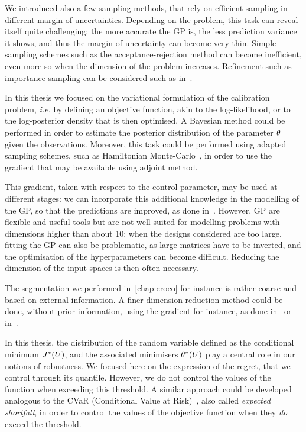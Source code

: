 \documentclass[../../Main_ManuscritThese.tex]{subfiles}
\begin{document}
We introduced also a few sampling methods, that rely on efficient
sampling in different margin of uncertainties. Depending on the
problem, this task can reveal itself quite challenging: the more
accurate the GP is, the less prediction variance it shows, and thus
the margin of uncertainty can become very thin. Simple sampling
schemes such as the acceptance-rejection method can become
inefficient, even more so when the dimension of the problem
increases. Refinement such as importance sampling can be considered
such as in~\cite{razaaly_rare_2019}.

In this thesis we focused on the variational formulation of the
calibration problem, \emph{i.e.} by defining an objective function,
akin to the log-likelihood, or to the log-posterior density that is
then optimised. A Bayesian method could be performed in order to
estimate the posterior distribution of the parameter $\theta$ given the
observations. Moreover, this task could be performed using adapted
sampling schemes, such as Hamiltonian
Monte-Carlo~\cite{betancourt_conceptual_2017}, in order to use the
gradient that may be available using adjoint method.

This gradient, taken with respect to the control parameter, may be
used at different stages: we can incorporate this additional knowledge
in the modelling of the GP, so that the predictions are improved, as
done in~\cite{bouhlel_gradient-enhanced_2019,laurent_overview_2019}.
However, GP are flexible and useful tools but are not well suited for
modelling problems with dimensions higher than about 10: when the
designs considered are too large, fitting the GP can also be
problematic, as large matrices have to be inverted, and the
optimisation of the hyperparameters can become difficult. Reducing the
dimension of the input spaces is then often necessary.

The segmentation we performed in~\cref{chap:croco} for instance is
rather coarse and based on external information. A finer dimension
reduction method could be done, without prior information, using the
gradient for instance, as done in~\cite{benameur_refinement_2002} or
in~\cite{zahm_certified_2018}.



In this thesis, the distribution of the random variable defined as the
conditional minimum $J^*(U)$, and the associated minimisers
$\theta^*(U)$ play a central role in our notions of robustness. We
focused here on the expression of the regret, that we control through
its quantile. However, we do not control the values of the function
when exceeding this threshold. A similar approach could be developed
analogous to the CVaR (Conditional Value at
Risk)~\cite{rockafellar_conditional_2002}, also called \emph{expected
  shortfall}, in order to control the values of the objective function
when they \emph{do} exceed the threshold.
\end{document}
